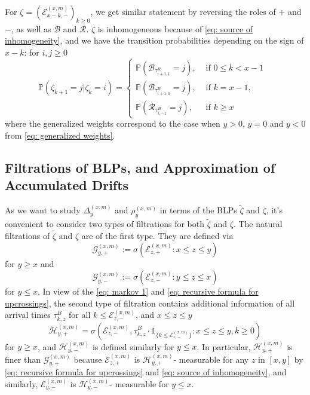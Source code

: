 \documentclass[twoside,12pt,a4paper]{article}
\numberwithin{equation}{section}
\begin{document}
	For $\zeta= \left(\mathcal{E}^{(x,m)}_{x-k,-} \right)_{k\geq 0}$, we get similar statement by reversing the roles of $+$ and $-$, as well as $\mathcal{B}$ and $\mathcal{R}$. $\zeta$ is inhomogeneous because of \eqref{eq: source of inhomogeneity}, and we have the transition probabilities depending on the sign of $x-k$: for $i,j\geq 0$
	\begin{equation}\label{eq: transition prob on negative}
		\mathbb{P}\left(\zeta_{k+1}=j \vert \zeta_k =i  \right) = 
		\begin{cases}
			\mathbb{P}\left( \mathcal{B}_{\tau_{i+1,1}^R} = j \right) ,& \mbox{ if $0 \leq k <  x-1$ }
			\\
			\mathbb{P}\left( \mathcal{B}_{\tau_{i+1,0}^R} = j \right) ,& \mbox{ if  $k =  x-1$, }
			\\
			\mathbb{P}\left( \mathcal{R}_{\tau_{i,-1}^B} = j \right) ,& \mbox{ if $k \geq x$ }
		\end{cases}
	\end{equation}
	where the generalized weights correspond to the case when $y>0$, $y=0$ and $y<0$ from \eqref{eq: generalized weights}.
	
	\subsection{Filtrations of BLPs, and Approximation of Accumulated Drifts}\label{subsec: measurability}
	
	As we want to study $\Delta^{(x,m)}_{y}$ and $\rho^{(x,m)}_{y}$ in terms of the BLPs $\tilde{\zeta}$ and $\zeta$, it's convenient to consider two types of filtrations for both $\tilde{\zeta}$ and $\zeta$. The natural filtrations of $\tilde{\zeta}$ and $\zeta$ are of the first type. They are defined via 
	$$\mathcal{G}_{y, +}^{(x,m)}:=\sigma\left(\mathcal{E}^{(x,m)}_{z, +}: x \le z \le y\right) $$ for $y \ge x$ and $$\mathcal{G}_{y, -}^{(x,m)}:=\sigma\left(\mathcal{E}^{(x,m)}_{z, -}: y \le z \le x\right) $$ for $y \le x$.
	In view of the \eqref{eq: markov 1} and \eqref{eq: recursive formula for upcrossings},
	the second type of filtration contains additional information of all arrival times $\tau^B_{k,z}$ for all $k\leq \mathcal{E}^{(x,m)}_{z, -}$, and $x\leq z \leq y$
	\[
	\mathcal{H}_{y, +}^{(x,m)} = \sigma\left( \mathcal{E}_{z, -}^{(x,m)}, \tau_{k, z}^{B}\cdot \mathbb{1}_{\{ k\leq \mathcal{E}_{z, -}^{(x,m)} \}} : x \leq  z \leq y,  k \geq 0 \right) 
	\]
	for $y\geq x$, and $\mathcal{H}_{y, -}^{(x,m)}$ is defined similarly for $y\leq x$.
	In particular, $\mathcal{H}_{y, +}^{(x,m)}$ is finer than $\mathcal{G}_{y, +}^{(x,m)}$ because $\mathcal{E}_{z, +}^{(x,m)}$ is  $\mathcal{H}_{y, +}^{(x,m)}$- measurable for any $z$ in $[x,y]$ by \eqref{eq: recursive formula for upcrossings} and \eqref{eq: source of inhomogeneity}, and similarly, $\mathcal{E}_{y, -}^{(x,m)}$ is $\mathcal{H}_{y, -}^{(x,m)}$- measurable for $ y\leq x$. 
	
\end{document}
